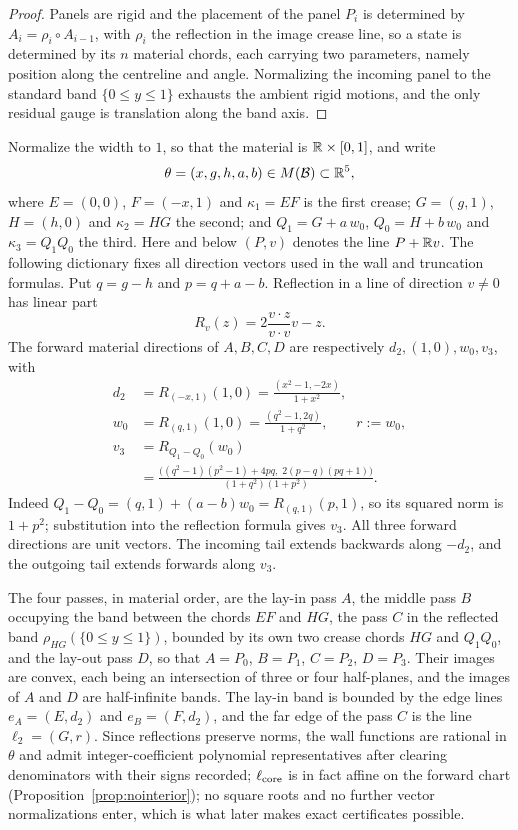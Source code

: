 \begin{proof}
Panels are rigid and the placement of the panel $P_i$ is determined by $A_i=\rho_i\circ A_{i-1}$, with $\rho_i$ the reflection in the image crease line, so a state is determined by its $n$ material chords, each carrying two parameters, namely position along the centreline and angle. Normalizing the incoming panel to the standard band $\{0\le y\le1\}$ exhausts the ambient rigid motions, and the only residual gauge is translation along the band axis.
\end{proof}

Normalize the width to $1$, so that the material is $\mathbb{R}\times[0,1]$, and write
\begin{equation}\label{eq:coords}
  \theta=(x,g,h,a,b)\in M(\mathcal{B})\subset\mathbb{R}^5 ,
\end{equation}
where $E=(0,0)$, $F=(-x,1)$ and $\kappa_1=EF$ is the first crease; $G=(g,1)$, $H=(h,0)$ and $\kappa_2=HG$ the second; and $Q_1=G+a\,w_0$, $Q_0=H+b\,w_0$ and $\kappa_3=Q_1Q_0$ the third. Here and below $(P,v)$ denotes the line $P+\mathbb{R} v$. The following dictionary fixes all direction vectors used in the wall and truncation formulas. Put $q=g-h$ and $p=q+a-b$. Reflection in a line of direction $v\ne0$ has linear part
\[
 R_v(z)=2\frac{v\cdot z}{v\cdot v}v-z.
\]
The forward material directions of $A,B,C,D$ are respectively $d_2,(1,0),w_0,v_3$, with
\begin{equation}\label{eq:directions}
\begin{aligned}
 d_2&=R_{(-x,1)}(1,0)
     =\frac{(x^2-1,-2x)}{1+x^2},\\
 w_0&=R_{(q,1)}(1,0)
     =\frac{(q^2-1,2q)}{1+q^2},\qquad r:=w_0,\\
 v_3&=R_{Q_1-Q_0}(w_0)\\
    &=\frac{\bigl((q^2-1)(p^2-1)+4pq,\;2(p-q)(pq+1)\bigr)}
            {(1+q^2)(1+p^2)}.
\end{aligned}
\end{equation}
Indeed $Q_1-Q_0=(q,1)+(a-b)w_0=R_{(q,1)}(p,1)$, so its squared norm is $1+p^2$; substitution into the reflection formula gives $v_3$. All three forward directions are unit vectors. The incoming tail extends backwards along $-d_2$, and the outgoing tail extends forwards along $v_3$.

The four passes, in material order, are the lay-in pass $A$, the middle pass $B$ occupying the band between the chords $EF$ and $HG$, the pass $C$ in the reflected band $\rho_{HG}(\{0\le y\le1\})$, bounded by its own two crease chords $HG$ and $Q_1Q_0$, and the lay-out pass $D$, so that $A=P_0$, $B=P_1$, $C=P_2$, $D=P_3$. Their images are convex, each being an intersection of three or four half-planes, and the images of $A$ and $D$ are half-infinite bands. The lay-in band is bounded by the edge lines $e_A=(E,d_2)$ and $e_B=(F,d_2)$, and the far edge of the pass $C$ is the line $\ell_2=(G,r)$. Since reflections preserve norms, the wall functions are rational in $\theta$ and admit integer-coefficient polynomial representatives after clearing denominators with their signs recorded; $\ell_{\mathrm{core}}$ is in fact affine on the forward chart (Proposition~\ref{prop:nointerior}); no square roots and no further vector normalizations enter, which is what later makes exact certificates possible.

